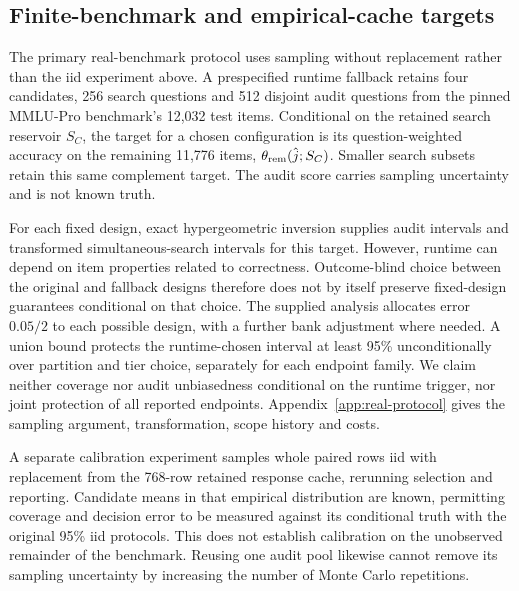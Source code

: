 \subsection{Finite-benchmark and empirical-cache targets}
The primary real-benchmark protocol uses sampling without replacement rather than the iid experiment above. A prespecified runtime fallback retains four candidates, 256 search questions and 512 disjoint audit questions from the pinned MMLU-Pro benchmark's 12,032 test items. Conditional on the retained search reservoir $S_C$, the target for a chosen configuration is its question-weighted accuracy on the remaining 11,776 items, $\theta_{\rm rem}(\hat j;S_C)$. Smaller search subsets retain this same complement target. The audit score carries sampling uncertainty and is not known truth.

For each fixed design, exact hypergeometric inversion supplies audit intervals and transformed simultaneous-search intervals for this target. However, runtime can depend on item properties related to correctness. Outcome-blind choice between the original and fallback designs therefore does not by itself preserve fixed-design guarantees conditional on that choice. The supplied analysis allocates error $0.05/2$ to each possible design, with a further bank adjustment where needed. A union bound protects the runtime-chosen interval at least 95\% unconditionally over partition and tier choice, separately for each endpoint family. We claim neither coverage nor audit unbiasedness conditional on the runtime trigger, nor joint protection of all reported endpoints. Appendix~\ref{app:real-protocol} gives the sampling argument, transformation, scope history and costs.

A separate calibration experiment samples whole paired rows iid with replacement from the 768-row retained response cache, rerunning selection and reporting. Candidate means in that empirical distribution are known, permitting coverage and decision error to be measured against its conditional truth with the original 95\% iid protocols. This does not establish calibration on the unobserved remainder of the benchmark. Reusing one audit pool likewise cannot remove its sampling uncertainty by increasing the number of Monte Carlo repetitions.
